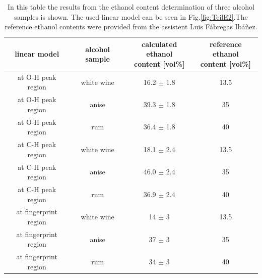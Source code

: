\documentclass[a4paper,abstracton]{article}	                       %
\begin{document}
\begin{table}[H]
\centering
\begin{tabular}{c|c|c|c}
    linear model & alcohol sample  & \thead{calculated ethanol \\ content [vol\%]} & \thead{reference ethanol \\ content [vol\%]}\\
     \hline
    at O-H peak region & white wine & 16.2 $\pm$ 1.8 & 13.5\\
    at O-H peak region & anise & 39.3 $\pm$ 1.8 & 35\\
    at O-H peak region & rum & 36.4 $\pm$ 1.8 & 40\\
     \hline
    at C-H peak region & white wine & 18.1 $\pm$ 2.4 & 13.5\\
    at C-H peak region & anise & 46.0 $\pm$ 2.4 & 35\\
    at C-H peak region & rum & 36.9 $\pm$ 2.4 & 40\\
     \hline
    at fingerprint region & white wine & 14 $\pm$ 3 & 13.5\\
    at fingerprint region & anise & 37 $\pm$ 3 & 35\\
    at fingerprint region & rum & 34 $\pm$ 3 & 40\\
\end{tabular}
\caption{\label{tab:TeilE} In this table the results from the ethanol content determination of three alcohol samples is shown. The used linear model can be seen in Fig.\ref{fig:TeilE2}.The reference ethanol contents were provided from the assistent Luis F\'abregas Ib\'a\~nez.}
\end{table}
\end{document}
